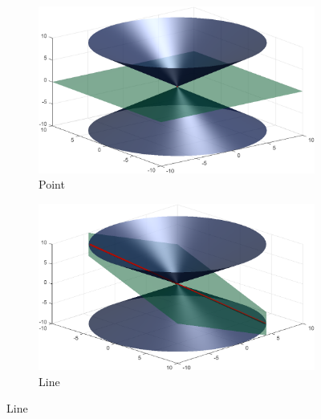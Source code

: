 \documentclass[fleqn]{LectureClass/LectureClass}
\begin{document}
    \begin{figure}
        \centering
        \begin{subfigure}{0.45\textwidth}
            \centering
            \includegraphics[width=\textwidth]{images/conic-sections-point}
            \caption{Point}
        \end{subfigure}
        \begin{subfigure}{0.45\textwidth}
            \centering
            \includegraphics[width=\textwidth]{images/conic-sections-line}
            \caption{Line}
        \end{subfigure}
        

\end{figure}
\end{document}
